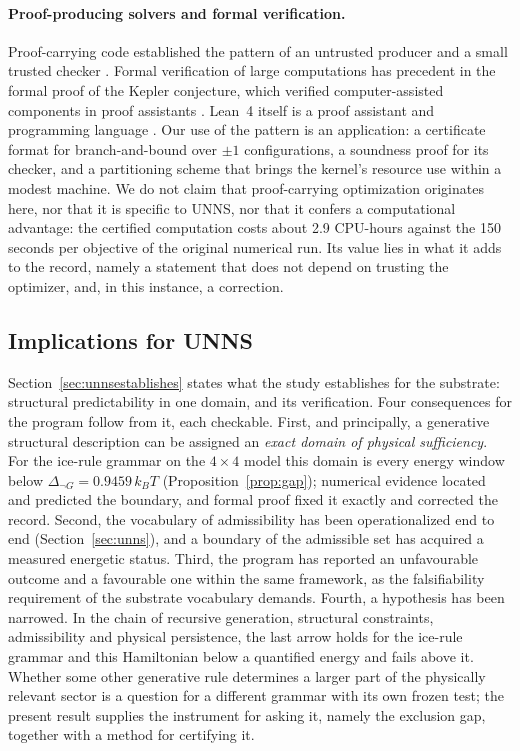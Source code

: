 \documentclass[11pt,a4paper]{article}
\theoremstyle{plain}
\theoremstyle{definition}
\theoremstyle{remark}
\newcommand{\dnG}{\Delta_{\neg G}}
\newcommand{\kBT}{k_{B}T}
\begin{document}
\paragraph{Proof-producing solvers and formal verification.}
Proof-carrying code established the pattern of an untrusted producer and a small trusted checker \cite{Necula1997}. Formal verification of large computations has precedent in the formal proof of the Kepler conjecture, which verified computer-assisted components in proof assistants \cite{Hales2017}. Lean~4 itself is a proof assistant and programming language \cite{deMoura2021}. Our use of the pattern is an application: a certificate format for branch-and-bound over $\pm1$ configurations, a soundness proof for its checker, and a partitioning scheme that brings the kernel's resource use within a modest machine. We do not claim that proof-carrying optimization originates here, nor that it is specific to UNNS, nor that it confers a computational advantage: the certified computation costs about 2.9 CPU-hours against the 150 seconds per objective of the original numerical run. Its value lies in what it adds to the record, namely a statement that does not depend on trusting the optimizer, and, in this instance, a correction.

\subsection{Implications for UNNS}
Section~\ref{sec:unnsestablishes} states what the study establishes for the substrate: structural predictability in one domain, and its verification. Four consequences for the program follow from it, each checkable. First, and principally, a generative structural description can be assigned an \emph{exact domain of physical sufficiency}. For the ice-rule grammar on the $4\times4$ model this domain is every energy window below $\dnG=0.9459\,\kBT$ (Proposition~\ref{prop:gap}); numerical evidence located and predicted the boundary, and formal proof fixed it exactly and corrected the record. Second, the vocabulary of admissibility has been operationalized end to end (Section~\ref{sec:unns}), and a boundary of the admissible set has acquired a measured energetic status. Third, the program has reported an unfavourable outcome and a favourable one within the same framework, as the falsifiability requirement of the substrate vocabulary demands. Fourth, a hypothesis has been narrowed. In the chain of recursive generation, structural constraints, admissibility and physical persistence, the last arrow holds for the ice-rule grammar and this Hamiltonian below a quantified energy and fails above it. Whether some other generative rule determines a larger part of the physically relevant sector is a question for a different grammar with its own frozen test; the present result supplies the instrument for asking it, namely the exclusion gap, together with a method for certifying it.
\end{document}
